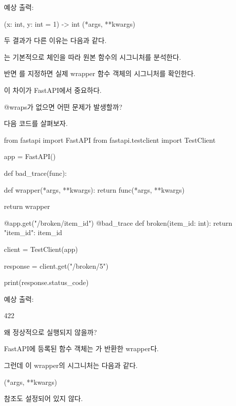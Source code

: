 예상 출력:

\begin{dhkzsh}
(x: int, y: int = 1) -> int
(*args, **kwargs)
\end{dhkzsh}

두 결과가 다른 이유는 다음과 같다.

는 기본적으로  체인을 따라 원본 함수의 시그니처를 분석한다.

반면 를 지정하면 실제 wrapper 함수 객체의 시그니처를 확인한다.

이 차이가 FastAPI에서 중요하다.

\begin{dhknote}
\begin{dhksmry}[centered]
@wraps가 없으면 어떤 문제가 발생할까?
\end{dhksmry}
\end{dhknote}

다음 코드를 살펴보자.

\begin{dhkcode}
from fastapi import FastAPI
from fastapi.testclient import TestClient


app = FastAPI()


def bad_trace(func):

    def wrapper(*args, **kwargs):
        return func(*args, **kwargs)

    return wrapper


@app.get("/broken/{item_id}")
@bad_trace
def broken(item_id: int):
    return {"item_id": item_id}


client = TestClient(app)

response = client.get("/broken/5")

print(response.status_code)
\end{dhkcode}

예상 출력:

\begin{dhkzsh}
422
\end{dhkzsh}

왜 정상적으로 실행되지 않을까?

FastAPI에 등록된 함수 객체는 가 반환한 wrapper다.

그런데 이 wrapper의 시그니처는 다음과 같다.

\begin{dhkcode}
(*args, **kwargs)
\end{dhkcode}

 참조도 설정되어 있지 않다.

